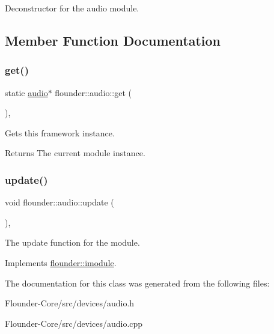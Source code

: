 Deconstructor for the audio module. 



\subsection{Member Function Documentation}
\mbox{\label{classflounder_1_1audio_ac827774b8855e8a921ef9141c2515df8}} 
\subsubsection{\texorpdfstring{get()}{get()}}
{\footnotesize\ttfamily static \hyperlink{classflounder_1_1audio}{audio}$\ast$ flounder\+::audio\+::get (\begin{DoxyParamCaption}{ }\end{DoxyParamCaption})\hspace{0.3cm}{\ttfamily [inline]}, {\ttfamily [static]}}



Gets this framework instance. 

\begin{DoxyReturn}{Returns}
The current module instance. 
\end{DoxyReturn}
\mbox{\label{classflounder_1_1audio_aabff6a1996b8571404023b6ac17009b6}} 
\subsubsection{\texorpdfstring{update()}{update()}}
{\footnotesize\ttfamily void flounder\+::audio\+::update (\begin{DoxyParamCaption}{ }\end{DoxyParamCaption})\hspace{0.3cm}{\ttfamily [override]}, {\ttfamily [virtual]}}



The update function for the module. 



Implements \hyperlink{classflounder_1_1imodule_a9a53d48a46b5f6b16a92b2cd8503f74a}{flounder\+::imodule}.



The documentation for this class was generated from the following files\+:\begin{DoxyCompactItemize}
\item 
Flounder-\/\+Core/src/devices/audio.\+h\item 
Flounder-\/\+Core/src/devices/audio.\+cpp\end{DoxyCompactItemize}
